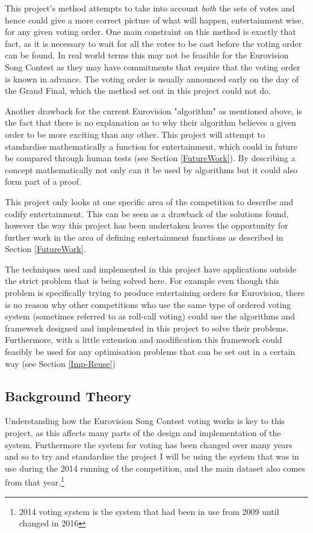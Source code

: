 \documentclass[12pt]{report}
\begin{document}
This project's method attempts to take into account \textit{both} the sets of votes and hence could give a more correct picture of what will happen, entertainment wise, for any given voting order. One main constraint on this method is exactly that fact, as it is necessary to wait for all the votes to be cast before the voting order can be found. In real world terms this may not be feasible for the Eurovision Song Contest as they may have commitments that require that the voting order is known in advance. The voting order is usually announced early on the day of the Grand Final, which the method set out in this project could not do.\cite{votingOrderQuote}

Another drawback for the current Eurovision "algorithm" as mentioned above, is the fact that there is no explanation as to why their algorithm believes a given order to be more exciting than any other. This project will attempt to standardise mathematically a function for entertainment, which could in future be compared through human tests (see Section  \ref{FutureWork}). By describing a concept mathematically not only can it be used by algorithms but it could also form part of a proof.

This project only looks at one specific area of the competition to describe and codify entertainment. This can be seen as a drawback of the solutions found, however the way this project has been undertaken leaves the opportunity for further work in the area of defining entertainment functions as described in Section \ref{FutureWork}.

The techniques used and implemented in this project have applications outside the strict problem that is being solved here. For example even though this problem is specifically trying to produce entertaining orders for Eurovision, there is no reason why other competitions who use the same type of ordered voting system (sometimes referred to as roll-call voting) could use the algorithms and framework designed and implemented in this project to solve their problems. Furthermore, with a little extension and modification this framework could feasibly be used for any optimisation problems that can be set out in a certain way (see Section \ref{Imp-Reuse})

\subsection{Background Theory}\label{BackgroundTheory}
Understanding how the Eurovision Song Contest voting works is key to this project, as this affects many parts of the design and implementation of the system. Furthermore the system for voting has been changed over many years and so to try and standardise the project I will be using the system that was in use during the 2014\cite{Eurovision2014} running of the competition, and the main dataset also comes from that year.\footnote{2014 voting system is the system that had been in use from 2009 until changed in 2016}
\end{document}
